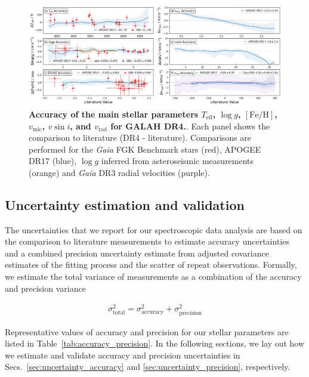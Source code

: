 \documentclass[
  journal=pasa,
  manuscript=research-paper, %
  year=2024,
  volume=37
]{cup-journal}
\newcommand{\Teff}{$T_\mathrm{eff}$\xspace}
\newcommand{\logg}{$\log g$\xspace}
\newcommand{\feh}{$\mathrm{[Fe/H]}$\xspace}
\newcommand{\vmic}{$v_\mathrm{mic}$\xspace}
\newcommand{\vsini}{$v \sin i$\xspace}
\newcommand{\vrad}{$v_\mathrm{rad}$\xspace}
\newcommand{\Gaia}{\textit{Gaia}\xspace}
\begin{document}
\begin{figure}[ht]
 \centering
 \includegraphics[width=\textwidth]{figures/galah_dr4_validation_parameter_accuracy_allstar.png}
 \caption{\textbf{Accuracy of the main stellar parameters \Teff, \logg, \feh, \vmic, \vsini, and \vrad for GALAH DR4.}. Each panel shows the comparison to literature (DR4 - literature). Comparisons are performed for the \Gaia FGK Benchmark stars (red), APOGEE DR17 (blue), \logg inferred from asteroseismic measurements (orange) and \Gaia DR3 radial velocities (purple).}
 \label{fig:galah_dr4_validation_parameter_accuracy_allstar}
\end{figure}

\subsection{Uncertainty estimation and validation}
\label{sec:uncertainty}

The uncertainties that we report for our spectroscopic data analysis are based on the comparison to literature measurements to estimate accuracy uncertainties and a combined precision uncertainty estimate from adjusted covariance estimates of the fitting process and the scatter of repeat observations. Formally, we estimate the total variance of measurements as a combination of the accuracy and precision variance

\begin{align}
    \sigma_\mathrm{total}^2 = \sigma_\mathrm{accuracy}^2 + \sigma_\mathrm{precision}^2
\end{align}

Representative values of accuracy and precision for our stellar parameters are listed in Table~\ref{tab:accuracy_precision}. In the following sections, we lay out how we estimate and validate accuracy and precision uncertainties in Secs.~\ref{sec:uncertainty_accuracy} and \ref{sec:uncertainty_precision}, respectively.
\end{document}
